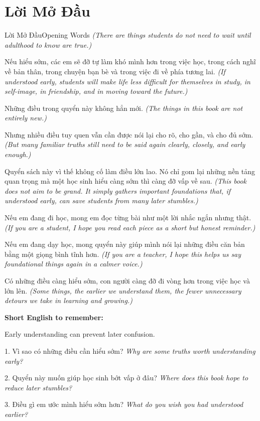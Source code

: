 \chapter*{Lời Mở Đầu}

\begin{truyen}{Lời Mở Đầu}{Opening Words}
\textit{(There are things students do not need to wait until adulthood to know are true.)}

Nếu hiểu sớm, các em sẽ đỡ tự làm khó mình hơn trong việc học, trong cách nghĩ về bản thân, trong chuyện bạn bè và trong việc đi về phía tương lai.
\textit{(If understood early, students will make life less difficult for themselves in study, in self-image, in friendship, and in moving toward the future.)}

Những điều trong quyển này không hẳn mới.
\textit{(The things in this book are not entirely new.)}

Nhưng nhiều điều tuy quen vẫn cần được nói lại cho rõ, cho gần, và cho đủ sớm.
\textit{(But many familiar truths still need to be said again clearly, closely, and early enough.)}

Quyển sách này vì thế không cố làm điều lớn lao. Nó chỉ gom lại những nền tảng quan trọng mà một học sinh hiểu càng sớm thì càng đỡ vấp về sau.
\textit{(This book does not aim to be grand. It simply gathers important foundations that, if understood early, can save students from many later stumbles.)}

Nếu em đang đi học, mong em đọc từng bài như một lời nhắc ngắn nhưng thật.
\textit{(If you are a student, I hope you read each piece as a short but honest reminder.)}

Nếu em đang dạy học, mong quyển này giúp mình nói lại những điều căn bản bằng một giọng bình tĩnh hơn.
\textit{(If you are a teacher, I hope this helps us say foundational things again in a calmer voice.)}
\end{truyen}

\begin{baihoc}
Có những điều càng hiểu sớm, con người càng đỡ đi vòng hơn trong việc học và lớn lên.
\textit{(Some things, the earlier we understand them, the fewer unnecessary detours we take in learning and growing.)}
\end{baihoc}

\begin{ghinhoanh}
\textbf{Short English to remember:}

Early understanding can prevent later confusion.

\end{ghinhoanh}

\begin{tuhocnhanh}
1. Vì sao có những điều cần hiểu sớm? \textit{Why are some truths worth understanding early?}

2. Quyển này muốn giúp học sinh bớt vấp ở đâu? \textit{Where does this book hope to reduce later stumbles?}

3. Điều gì em ước mình hiểu sớm hơn? \textit{What do you wish you had understood earlier?}
\end{tuhocnhanh}

\ngancach